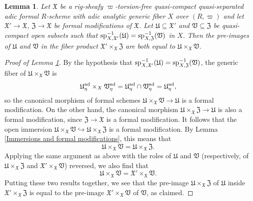 \documentclass[12pt,twoside,a4paper]{article}
\newtheorem{lemma}[thm]{Lemma}
\theoremstyle{definition}
\theoremstyle{remark}
\newcommand\ad{{\rm ad}}
\newcommand\spc{{\rm sp}}
\begin{document}
\begin{lemma}\label{Formal modifications and affine opens}Let $\mathfrak{X}$ be a rig-sheafy $\varpi$-torsion-free quasi-compact quasi-separated adic formal $R$-scheme with adic analytic generic fiber $X$ over $(R, \varpi)$ and let $\mathfrak{X}'\to \mathfrak{X}$, $\mathfrak{Z}\to\mathfrak{X}$ be formal modifications of $\mathfrak{X}$. Let $\mathfrak{U}\subseteq \mathfrak{X}'$ and $\mathfrak{V}\subseteq \mathfrak{Z}$ be quasi-compact open subsets such that $\spc_{X,\mathfrak{X}'}^{-1}(\mathfrak{U})=\spc_{X,\mathfrak{Z}}^{-1}(\mathfrak{V})$ in $X$. Then the pre-images of $\mathfrak{U}$ and $\mathfrak{V}$ in the fiber product $\mathfrak{X}'\times_{\mathfrak{X}}\mathfrak{Z}$ are both equal to $\mathfrak{U}\times_{\mathfrak{X}}\mathfrak{V}$.\end{lemma}
\begin{proof}[Proof of Lemma \ref{Formal modifications and affine opens}]By the hypothesis that $\spc_{X,\mathfrak{X}'}^{-1}(\mathfrak{U})=\spc_{X,\mathfrak{Z}}^{-1}(\mathfrak{V})$, the generic fiber of $\mathfrak{U}\times_{\mathfrak{X}}\mathfrak{V}$ is \begin{equation*}\mathfrak{U}_{\eta}^{\ad}\times_{X}\mathfrak{V}_{\eta}^{\ad}=\mathfrak{U}_{\eta}^{\ad}\cap\mathfrak{V}_{\eta}^{\ad}=\mathfrak{U}_{\eta}^{\ad},\end{equation*}so the canonical morphism of formal schemes $\mathfrak{U}\times_{\mathfrak{X}}\mathfrak{V}\to \mathfrak{U}$ is a formal modification. On the other hand, the canonical morphism $\mathfrak{U}\times_{\mathfrak{X}}\mathfrak{Z}\to\mathfrak{U}$ is also a formal modification, since $\mathfrak{Z}\to\mathfrak{X}$ is a formal modification. It follows that the open immersion $\mathfrak{U}\times_{\mathfrak{X}}\mathfrak{V}\hookrightarrow \mathfrak{U}\times_{\mathfrak{X}}\mathfrak{Z}$ is a formal modification. By Lemma \ref{Immersions and formal modifications}, this means that\begin{equation*}\mathfrak{U}\times_{\mathfrak{X}}\mathfrak{V}=\mathfrak{U}\times_{\mathfrak{X}}\mathfrak{Z}.\end{equation*}Applying the same argument as above with the roles of $\mathfrak{U}$ and $\mathfrak{V}$ (respectively, of $\mathfrak{U}\times_{\mathfrak{X}}\mathfrak{Z}$ and $\mathfrak{X}'\times_{\mathfrak{X}}\mathfrak{V}$) reversed, we also find that \begin{equation*}\mathfrak{U}\times_{\mathfrak{X}}\mathfrak{V}=\mathfrak{X}'\times_{\mathfrak{X}}\mathfrak{V}.\end{equation*}Putting these two results together, we see that the pre-image $\mathfrak{U}\times_{\mathfrak{X}}\mathfrak{Z}$ of $\mathfrak{U}$ inside $\mathfrak{X}'\times_{\mathfrak{X}}\mathfrak{Z}$ is equal to the pre-image $\mathfrak{X}'\times_{\mathfrak{X}}\mathfrak{V}$ of $\mathfrak{V}$, as claimed.\end{proof}
\end{document}
